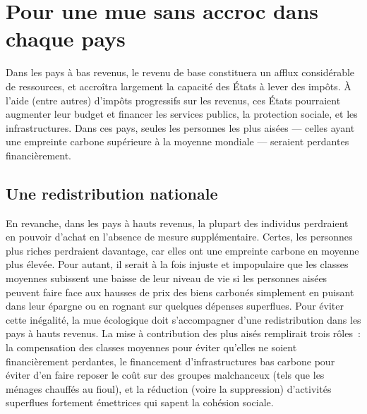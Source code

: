\documentclass[a5paper,french,openany]{memoir}
\begin{document}
\section{Pour une mue sans accroc dans chaque pays}\label{sec:mue_nationale}

Dans les pays à bas revenus, le revenu de base constituera un afflux considérable de ressources, et accroîtra largement la capacité des États à lever des impôts. À l'aide (entre autres) d'impôts progressifs sur les revenus, ces États pourraient augmenter leur budget et financer les services publics, la protection sociale, et les infrastructures. Dans ces pays, seules les personnes les plus aisées --- celles ayant une empreinte carbone supérieure à la moyenne mondiale --- seraient perdantes financièrement. 

\subsection{Une redistribution nationale} %
En revanche, dans les pays à hauts revenus, la plupart des individus perdraient en pouvoir d'achat en l'absence de mesure supplémentaire. Certes, les personnes plus riches perdraient davantage, car elles ont une empreinte carbone en moyenne plus élevée. Pour autant, il serait à la fois injuste et impopulaire que les classes moyennes subissent une baisse de leur niveau de vie si les personnes aisées peuvent faire face aux hausses de prix des biens carbonés simplement en puisant dans leur épargne ou en rognant sur quelques dépenses superflues. Pour éviter cette inégalité, la mue écologique doit s'accompagner d'une redistribution dans les pays à hauts revenus. La mise à contribution des plus aisés remplirait trois rôles~: la compensation des classes moyennes pour éviter qu'elles ne soient financièrement perdantes, le financement d'infrastructures bas carbone pour éviter d'en faire reposer le coût sur des groupes malchanceux (tels que les ménages chauffés au fioul), %
et la réduction (voire la suppression) d'activités superflues fortement émettrices qui sapent la cohésion sociale.
\end{document}
